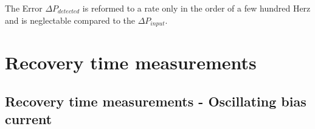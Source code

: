The Error  $\Delta P_{detected} $ is reformed to a rate only in the order of a few hundred Herz and
is neglectable compared to the  $\Delta P_{input}$.


\section{Recovery time measurements}\label{sec:Recovery time measurements}

\subsection{Recovery time measurements - Oscillating bias current} \label{subsec:recovery-time-measurements---oscillating_bias_current}

%


